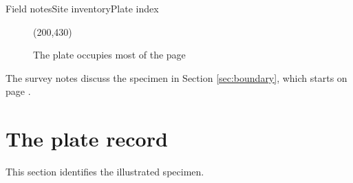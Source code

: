 \documentclass{article}
\begin{document}
Field notes\clearpage Site inventory\clearpage Plate index\clearpage
\begin{figure}[!t]
\framebox(200,430){}
\caption{The plate occupies most of the page}
\end{figure}
The survey notes discuss the specimen in Section \ref{sec:boundary},
which starts on page \pageref{sec:boundary}.
\section{The plate record\label{sec:boundary}}
This section identifies the illustrated specimen.
\end{document}
